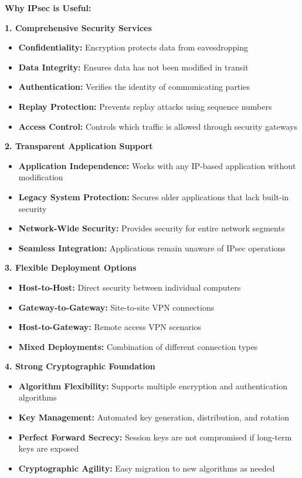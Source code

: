\documentclass[12pt,a4paper]{article}
\begin{document}
\textbf{Why IPsec is Useful:}

\textbf{1. Comprehensive Security Services}
\begin{itemize}
    \item \textbf{Confidentiality:} Encryption protects data from eavesdropping
    \item \textbf{Data Integrity:} Ensures data has not been modified in transit
    \item \textbf{Authentication:} Verifies the identity of communicating parties
    \item \textbf{Replay Protection:} Prevents replay attacks using sequence numbers
    \item \textbf{Access Control:} Controls which traffic is allowed through security gateways
\end{itemize}

\textbf{2. Transparent Application Support}
\begin{itemize}
    \item \textbf{Application Independence:} Works with any IP-based application without modification
    \item \textbf{Legacy System Protection:} Secures older applications that lack built-in security
    \item \textbf{Network-Wide Security:} Provides security for entire network segments
    \item \textbf{Seamless Integration:} Applications remain unaware of IPsec operations
\end{itemize}

\textbf{3. Flexible Deployment Options}
\begin{itemize}
    \item \textbf{Host-to-Host:} Direct security between individual computers
    \item \textbf{Gateway-to-Gateway:} Site-to-site VPN connections
    \item \textbf{Host-to-Gateway:} Remote access VPN scenarios
    \item \textbf{Mixed Deployments:} Combination of different connection types
\end{itemize}

\textbf{4. Strong Cryptographic Foundation}
\begin{itemize}
    \item \textbf{Algorithm Flexibility:} Supports multiple encryption and authentication algorithms
    \item \textbf{Key Management:} Automated key generation, distribution, and rotation
    \item \textbf{Perfect Forward Secrecy:} Session keys are not compromised if long-term keys are exposed
    \item \textbf{Cryptographic Agility:} Easy migration to new algorithms as needed
\end{itemize}
\end{document}
